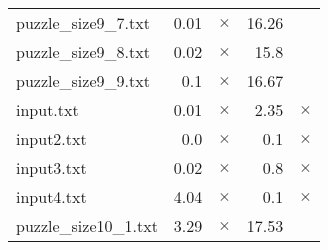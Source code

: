 \documentclass{article}
\begin{document}
\begin{center}
\begin{tabular}{lrrrr}
puzzle\_size9\_7.txt & 0.01 & 
$\times$
 & 16.26 & 
\\
puzzle\_size9\_8.txt & 0.02 & 
$\times$
 & 15.8 & 
\\
puzzle\_size9\_9.txt & 0.1 & 
$\times$
 & 16.67 & 
\\
input.txt & 0.01 & 
$\times$
 & 2.35 & 
$\times$
\\
input2.txt & 0.0 & 
$\times$
 & 0.1 & 
$\times$
\\
input3.txt & 0.02 & 
$\times$
 & 0.8 & 
$\times$
\\
input4.txt & 4.04 & 
$\times$
 & 0.1 & 
$\times$
\\
puzzle\_size10\_1.txt & 3.29 & 
$\times$
 & 17.53 & 
\\
\hline\end{tabular}
\end{center}
\end{document}
